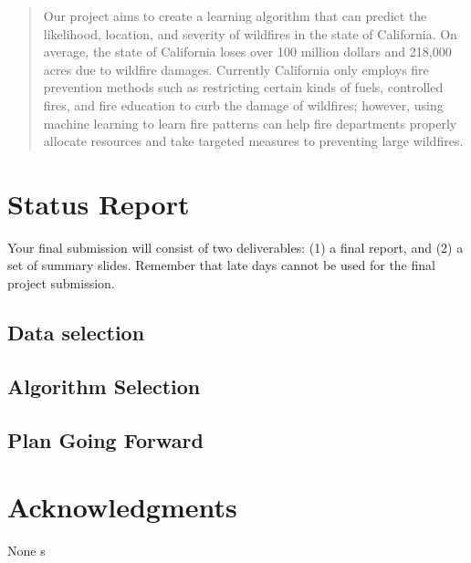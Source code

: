 \documentclass{article}
\begin{document}
 


\begin{abstract} 
Our project aims to create a learning algorithm that can predict the likelihood, location, and severity of wildfires in the state of California. On average, the state of California loses over 100 million dollars and 218,000 acres\cite{calfire11} due to wildfire damages. Currently California only employs fire prevention methods such as restricting certain kinds of fuels, controlled fires, and fire education to curb the damage of wildfires; however, using machine learning to learn fire patterns can help fire departments properly allocate resources and take targeted measures to preventing large wildfires.
\end{abstract} 

\section{Status Report}

Your final submission will consist of two deliverables:  (1) a final report, and (2) a set of summary slides.  Remember that late days cannot be used for
the final project submission.

\subsection{Data selection} 

\subsection{Algorithm Selection}

\subsection{Plan Going Forward}

\section*{Acknowledgments} 
None s


\end{document}
